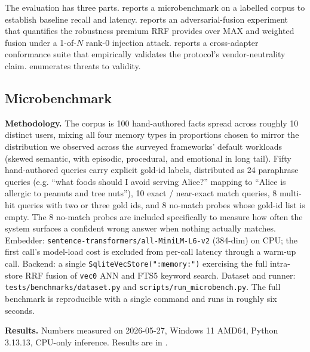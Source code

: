 \documentclass[11pt,letterpaper,twocolumn]{article}
\begin{document}
The evaluation has three parts.  reports a microbenchmark on a labelled corpus to establish baseline recall and latency.  reports an adversarial-fusion experiment that quantifies the robustness premium RRF provides over MAX and weighted fusion under a 1-of-$N$ rank-0 injection attack.  reports a cross-adapter conformance suite that empirically validates the protocol's vendor-neutrality claim.  enumerates threats to validity.

\subsection{Microbenchmark}
\label{sec:eval-micro}

\textbf{Methodology.} The corpus is 100 hand-authored facts spread across roughly 10 distinct users, mixing all four memory types in proportions chosen to mirror the distribution we observed across the surveyed frameworks' default workloads (skewed semantic, with episodic, procedural, and emotional in long tail). Fifty hand-authored queries carry explicit gold-id labels, distributed as 24 paraphrase queries (e.g. ``what foods should I avoid serving Alice?'' mapping to ``Alice is allergic to peanuts and tree nuts''), 10 exact / near-exact match queries, 8 multi-hit queries with two or three gold ids, and 8 no-match probes whose gold-id list is empty. The 8 no-match probes are included specifically to measure how often the system surfaces a confident wrong answer when nothing actually matches. Embedder: \texttt{sentence-transformers/all-MiniLM-L6-v2} (384-dim) on CPU; the first call's model-load cost is excluded from per-call latency through a warm-up call. Backend: a single \texttt{SqliteVecStore(":memory:")} exercising the full intra-store RRF fusion of \texttt{vec0} ANN and FTS5 keyword search. Dataset and runner: \texttt{tests/benchmarks/dataset.py} and \texttt{scripts/run\_microbench.py}. The full benchmark is reproducible with a single command and runs in roughly six seconds.

\textbf{Results.} Numbers measured on 2026-05-27, Windows 11 AMD64, Python 3.13.13, CPU-only inference. Results are in .
\end{document}
